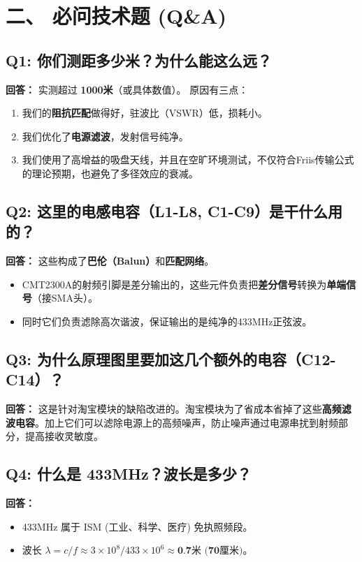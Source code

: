 \documentclass[a4paper,12pt]{ctexart}
\begin{document}
	\section{二、 必问技术题 (Q\&A)}

	\subsection*{Q1: 你们测距多少米？为什么能这么远？}
	\textbf{回答：}
	实测超过 \textbf{1000米}（或具体数值）。
	原因有三点：
	\begin{enumerate}
		\item 我们的\textbf{阻抗匹配}做得好，驻波比（VSWR）低，损耗小。
		\item 我们优化了\textbf{电源滤波}，发射信号纯净。
		\item 我们使用了高增益的吸盘天线，并且在空旷环境测试，不仅符合Friis传输公式的理论预期，也避免了多径效应的衰减。
	\end{enumerate}

	\subsection*{Q2: 这里的电感电容（L1-L8, C1-C9）是干什么用的？}
	\textbf{回答：}
	这些构成了\textbf{巴伦（Balun）}和\textbf{匹配网络}。
	\begin{itemize}
		\item CMT2300A的射频引脚是差分输出的，这些元件负责把\textbf{差分信号}转换为\textbf{单端信号}（接SMA头）。
		\item 同时它们负责滤除高次谐波，保证输出的是纯净的433MHz正弦波。
	\end{itemize}

	\subsection*{Q3: 为什么原理图里要加这几个额外的电容（C12-C14）？}
	\textbf{回答：}
	这是针对淘宝模块的缺陷改进的。淘宝模块为了省成本省掉了这些\textbf{高频滤波电容}。加上它们可以滤除电源上的高频噪声，防止噪声通过电源串扰到射频部分，提高接收灵敏度。

	\subsection*{Q4: 什么是 433MHz？波长是多少？}
	\textbf{回答：}
	\begin{itemize}
		\item 433MHz 属于 ISM (工业、科学、医疗) 免执照频段。
		\item 波长 $\lambda = c / f \approx 3 \times 10^8 / 433 \times 10^6 \approx \textbf{0.7米 (70厘米)}$。
	\end{itemize}
\end{document}
